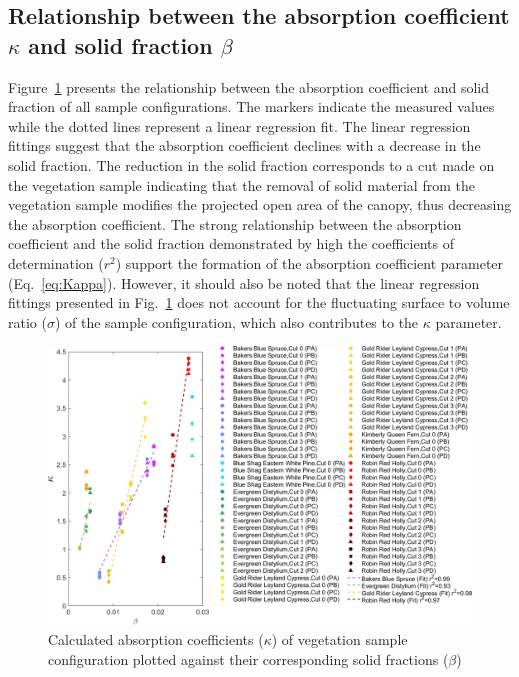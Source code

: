 \documentclass[12pt]{article}
\begin{document}
\subsection{Relationship between the absorption coefficient $\kappa$ and solid fraction $\beta$ }

Figure~\ref{fig:betavkappa} presents the relationship between the absorption coefficient and solid fraction of all sample configurations. The markers indicate the measured values while the dotted lines represent a linear regression fit. The linear regression fittings suggest that the absorption coefficient declines with a decrease in the solid fraction. The reduction in the solid fraction corresponds to a cut made on the vegetation sample indicating that the removal of solid material from the vegetation sample modifies the projected open area of the canopy, thus decreasing the absorption coefficient. The strong relationship between the absorption coefficient and the solid fraction demonstrated by high the coefficients of determination ($r^2$) support the formation of the absorption coefficient parameter (Eq.~\ref{eq:Kappa}). However, it should also be noted that the linear regression fittings presented in Fig.~\ref{fig:betavkappa} does not account for the fluctuating surface to volume ratio ($\sigma$) of the sample configuration, which also contributes to the $\kappa$ parameter.

\begin{figure}
	\centering 	
    \includegraphics[width=1.1\linewidth]{Picture12.jpg}
	\caption[Comparison of absorption coefficient, $\kappa$, and volume ratio, $\beta$]{Calculated absorption coefficients ($\kappa$) of vegetation sample configuration plotted against their corresponding solid fractions ($\beta$)}
	\label{fig:betavkappa}
\end{figure}
\end{document}
